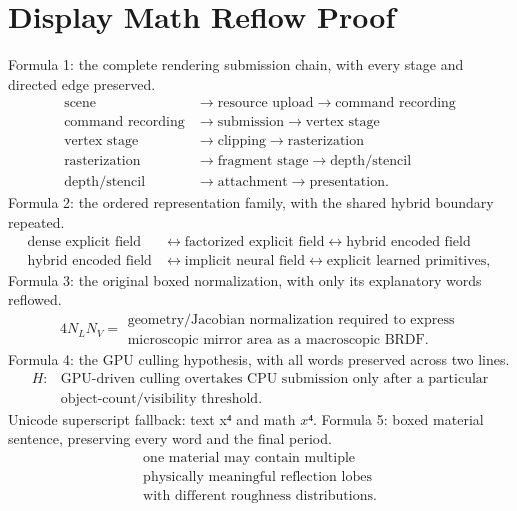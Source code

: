 \documentclass[11pt,twoside,openany]{book}
\begin{document}
\chapter*{Display Math Reflow Proof}
\noindent Formula 1: the complete rendering submission chain, with every stage and directed edge preserved.
\[
\begin{aligned}\text{scene} &\rightarrow \text{resource upload} \rightarrow \text{command recording}\\\text{command recording} &\rightarrow \text{submission} \rightarrow \text{vertex stage}\\\text{vertex stage} &\rightarrow \text{clipping} \rightarrow \text{rasterization}\\\text{rasterization} &\rightarrow \text{fragment stage} \rightarrow \text{depth/stencil}\\\text{depth/stencil} &\rightarrow \text{attachment} \rightarrow \text{presentation}.\end{aligned}
\]
\clearpage
\noindent Formula 2: the ordered representation family, with the shared hybrid boundary repeated.
\[
\begin{aligned}\text{dense explicit field} &\leftrightarrow \text{factorized explicit field} \leftrightarrow \text{hybrid encoded field}\\\text{hybrid encoded field} &\leftrightarrow \text{implicit neural field} \leftrightarrow \text{explicit learned primitives},\end{aligned}
\]
\clearpage
\noindent Formula 3: the original boxed normalization, with only its explanatory words reflowed.
\[
\boxed{4N_LN_V=\begin{gathered}\text{geometry/Jacobian normalization required to express}\\\text{microscopic mirror area as a macroscopic BRDF}.\end{gathered}}
\]
\clearpage
\noindent Formula 4: the GPU culling hypothesis, with all words preserved across two lines.
\[
\begin{aligned}H: &\text{GPU-driven culling overtakes CPU submission only after a particular}\\&\text{object-count/visibility threshold.}\end{aligned}
\]
\bigskip
\noindent Unicode superscript fallback: text x⁴ and math $x⁴$.
\clearpage
\noindent Formula 5: boxed material sentence, preserving every word and the final period.
\[
\boxed{\begin{gathered}\text{one material may contain multiple}\\\text{physically meaningful reflection lobes}\\\text{with different roughness distributions}.\end{gathered}}
\]
\end{document}
